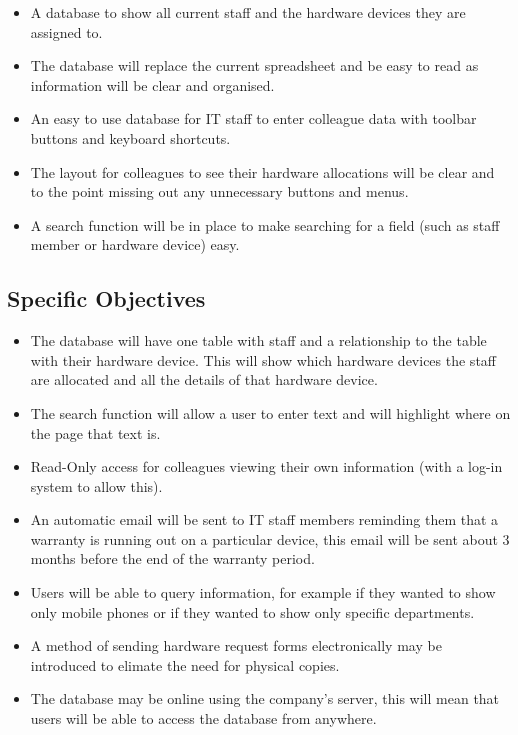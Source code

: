 \begin{itemize}
\item A database to show all current staff and the hardware devices they are assigned to.
\item The database will replace the current spreadsheet and be easy to read as information will be clear and organised.
\item An easy to use database for IT staff to enter colleague data with toolbar buttons and keyboard shortcuts.
\item The layout for colleagues to see their hardware allocations will be clear and to the point missing out any unnecessary buttons and menus.
\item A search function will be in place to make searching for a field (such as staff member or hardware device) easy.
\end{itemize}

\subsection{Specific Objectives}

\begin{itemize}
\item The database will have one table with staff and a relationship to the table with their hardware device. This will show which hardware devices the staff are allocated and all the details of that hardware device.
\item The search function will allow a user to enter text and will highlight where on the page that text is.
\item Read-Only access for colleagues viewing their own information (with a log-in system to allow this).
\item  An automatic email will be sent to IT staff members reminding them that a warranty is running out on a particular device, this email will be sent about 3 months before the end of the warranty period.
\item Users will be able to query information, for example if they wanted to show only mobile phones or if they wanted to show only specific departments.
\item A method of sending hardware request forms electronically may be introduced to elimate the need for physical copies.
\item The database may be online using the company's server, this will mean that users will be able to access the database from anywhere.
\end{itemize}

